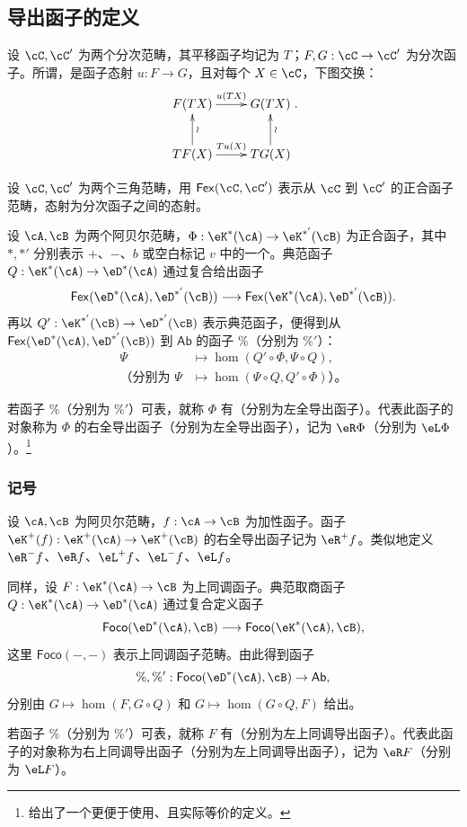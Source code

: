 \subsection{导出函子的定义}\label{VIII:4-1}
\begin{definition}\label{VIII:4-1-1}
设 $\cC,\cC'$ 为两个分次范畴，其平移函子均记为 $T$；$F,G:\cC\to\cC'$ 为分次函子。所谓，是函子态射 $u:F\to G$，且对每个 $X\in\cC$，下图交换：
\[\xymatrix{F(TX)\ar[r]^-{u(TX)}&G(TX)\\TF(X)\ar[r]^-{Tu(X)}\ar[u]_-\wr&TG(X)\ar[u]_-\wr}.\]
\end{definition}
设 $\cC,\cC'$ 为两个三角范畴，用 $\mathsf{Fex}(\cC,\cC')$ 表示从 $\cC$ 到 $\cC'$ 的正合函子范畴，态射为分次函子之间的态射。

设 $\cA,\cB$ 为两个阿贝尔范畴，$\Phi:\eK^\ast(\cA)\to\eK^{\ast'}(\cB)$ 为正合函子，其中 $\ast,\ast'$ 分别表示 $+$、$-$、$b$ 或空白标记 $v$ 中的一个。典范函子 $Q:\eK^\ast(\cA)\to\eD^\ast(\cA)$ 通过复合给出函子
\[\mathsf{Fex}(\eD^\ast(\cA),\eD^{\ast'}(\cB))\longrightarrow
\mathsf{Fex}(\eK^\ast(\cA),\eD^{\ast'}(\cB)).\]
再以 $Q':\eK^{\ast'}(\cB)\to\eD^{\ast'}(\cB)$ 表示典范函子，便得到从 $\mathsf{Fex}(\eD^\ast(\cA),\eD^{\ast'}(\cB))$ 到 $\mathsf{Ab}$ 的函子 $\%$（分别为 $\%'$）：
\begin{align*}
\Psi&\longmapsto\hom(Q'\circ\Phi,\Psi\circ Q),\\
\text{（分别为 }\Psi&\longmapsto\hom(\Psi\circ Q,Q'\circ\Phi)\text{）。}
\end{align*}
\begin{definition}\label{VIII:4-1-2}
若函子 $\%$（分别为 $\%'$）可表，就称 $\Phi$ 有（分别为左全导出函子）。代表此函子的对象称为 $\Phi$ 的右全导出函子（分别为左全导出函子），记为 $\eR\Phi$（分别为 $\eL\Phi$）。\footnote{\cite[XVII 1.2]{sga4} 给出了一个更便于使用、且实际等价的定义。}
\end{definition}
\subsubsection{记号}\label{VIII:4-1-3}
设 $\cA,\cB$ 为阿贝尔范畴，$f:\cA\to\cB$ 为加性函子。函子 $\eK^+(f):\eK^+(\cA)\to\eK^+(\cB)$ 的右全导出函子记为 $\eR^+f$。类似地定义 $\eR^-f$、$\eR f$、$\eL^+f$、$\eL^-f$、$\eL f$。

同样，设 $F:\eK^\ast(\cA)\to\cB$ 为上同调函子。典范取商函子 $Q:\eK^\ast(\cA)\to\eD^\ast(\cA)$ 通过复合定义函子
\[\mathsf{Foco}(\eD^\ast(\cA),\cB)\longrightarrow\mathsf{Foco}(\eK^\ast(\cA),\cB),\]
这里 $\mathsf{Foco}(-,-)$ 表示上同调函子范畴。由此得到函子
\[\%,\%':\mathsf{Foco}(\eD^\ast(\cA),\cB)\to\mathsf{Ab},\]
分别由 $G\mapsto\hom(F,G\circ Q)$ 和 $G\mapsto\hom(G\circ Q,F)$ 给出。
\begin{definition}\label{VIII:4-1-4}
若函子 $\%$（分别为 $\%'$）可表，就称 $F$ 有（分别为左上同调导出函子）。代表此函子的对象称为右上同调导出函子（分别为左上同调导出函子），记为 $\eR F$（分别为 $\eL F$）。
\end{definition}
